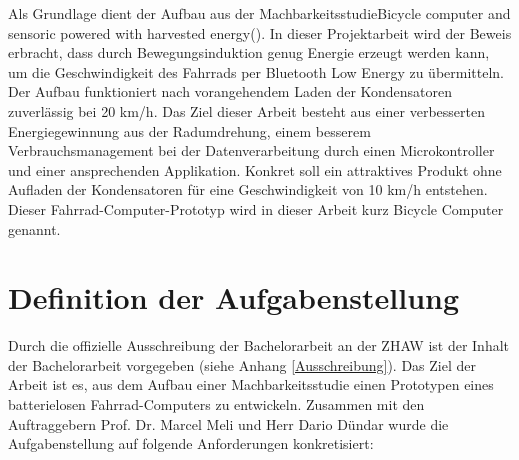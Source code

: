 Als Grundlage dient der Aufbau aus der Machbarkeitsstudie\glqq  Bicycle computer and sensoric powered with harvested energy\grqq (\cite{PA_bicycle}). In dieser Projektarbeit wird der Beweis erbracht, dass durch Bewegungsinduktion genug Energie erzeugt werden kann, um die Geschwindigkeit des Fahrrads per Bluetooth Low Energy zu übermitteln. Der Aufbau funktioniert nach vorangehendem Laden der Kondensatoren zuverlässig bei 20 km/h. Das Ziel dieser Arbeit besteht aus einer verbesserten Energiegewinnung aus der Radumdrehung, einem besserem Verbrauchsmanagement bei der Datenverarbeitung durch einen Microkontroller und einer ansprechenden Applikation. Konkret soll ein attraktives Produkt ohne Aufladen der Kondensatoren für eine Geschwindigkeit von 10 km/h entstehen. Dieser Fahrrad-Computer-Prototyp wird in dieser Arbeit kurz Bicycle Computer genannt.



\section{Definition der Aufgabenstellung}\label{Aufgabenstellung} 

Durch die offizielle Ausschreibung der Bachelorarbeit an der ZHAW ist der Inhalt der Bachelorarbeit vorgegeben (siehe Anhang \ref{Ausschreibung}). Das Ziel der Arbeit ist es, aus dem Aufbau einer Machbarkeitsstudie einen Prototypen eines batterielosen Fahrrad-Computers zu entwickeln. Zusammen mit den Auftraggebern Prof. Dr. Marcel Meli und Herr Dario Dündar wurde die Aufgabenstellung auf folgende Anforderungen konkretisiert:

